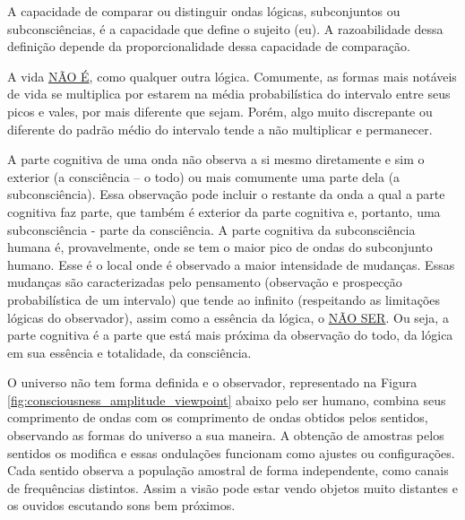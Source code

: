 A capacidade de comparar ou distinguir ondas lógicas, subconjuntos ou subconsciências, é a capacidade que define o sujeito (eu). A razoabilidade dessa definição depende da proporcionalidade dessa capacidade de comparação.

A vida \underline{NÃO É}, como qualquer outra lógica. Comumente, as formas mais notáveis de vida se multiplica por estarem na média probabilística do intervalo entre seus picos e vales, por mais diferente que sejam. Porém, algo muito discrepante ou diferente do padrão médio do intervalo tende a não multiplicar e permanecer.

A parte cognitiva de uma onda não observa a si mesmo diretamente e sim o exterior (a consciência – o todo) ou mais comumente uma parte dela (a subconsciência). Essa observação pode incluir o restante da onda a qual a parte cognitiva faz parte, que também é exterior da parte cognitiva e, portanto, uma subconsciência - parte da consciência. A parte cognitiva da subconsciência humana é, provavelmente, onde se tem o maior pico de ondas do subconjunto humano. Esse é o local onde é observado a maior intensidade de mudanças. Essas mudanças são caracterizadas pelo pensamento (observação e prospecção probabilística de um intervalo) que tende ao infinito (respeitando as limitações lógicas do observador), assim como a essência da lógica, o \underline{NÃO SER}. Ou seja, a parte cognitiva é a parte que está mais próxima da observação do todo, da lógica em sua essência e totalidade, da consciência.

O universo não tem forma definida e o observador, representado na Figura \ref{fig:consciousness_amplitude_viewpoint} abaixo pelo ser humano, combina seus comprimento de ondas com os comprimento de ondas obtidos pelos sentidos, observando as formas do universo a sua maneira. A obtenção de amostras pelos sentidos os modifica e essas ondulações funcionam como ajustes ou configurações. Cada sentido observa a população amostral de forma independente, como canais de frequências distintos. Assim a visão pode estar vendo objetos muito distantes e os ouvidos escutando sons bem próximos.

